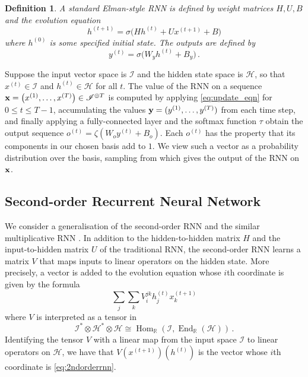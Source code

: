 \documentclass[english,letter paper,12pt,leqno]{article}
\theoremstyle{example}
\newtheorem{definition}[theorem]{Definition}
\numberwithin{equation}{section}
\def\Hom{\operatorname{Hom}}
\def\be{\begin{equation}}
\def\ee{\end{equation}}
\DeclareMathOperator{\End}{End}
\begin{document}
\begin{definition} A standard Elman-style RNN \cite{elman} is defined by weight matrices $H, U, B$ and the evolution equation
\be\label{eq:update_eqn}
h^{(t+1)} = \sigma\big( H h^{(t)} + U x^{(t+1)} + B\big)
\ee
where $h^{(0)}$ is some specified initial state. The outputs are defined by
\be\label{eq:output_rnn}
y^{(t)} = \sigma\big( W_y h^{(t)} + B_y \big)\,.
\ee
\end{definition}
Suppose the input vector space is $\mathscr{I}$ and the hidden state space is $\mathscr{H}$, so that $x^{(t)} \in \mathscr{I}$ and $h^{(t)} \in \mathscr{H}$ for all $t$. The value of the RNN on a sequence $\bold{x} = \big( x^{(1)}, \ldots, x^{(T)} \big) \in \mathscr{I}^{\oplus T}$ is computed by applying \eqref{eq:update_eqn} for $0 \le t \le T - 1$, accumulating the values $\bold{y} = (y^{(1)}, \ldots, y^{(T)})$ from each time step, and finally applying a fully-connected layer and the softmax function $\tau$ obtain the output sequence $o^{(t)} = \zeta( W_o y^{(t)} + B_o )$. Each $o^{(t)}$ has the property that its components in our chosen basis add to $1$. We view such a vector as a probability distribution over the basis, sampling from which gives the output of the RNN on $\bold{x}$.
\\

\subsection{Second-order Recurrent Neural Network}

We consider a generalisation of the second-order RNN \cite{highorderrec,pollack,firstvsecond,secondorder} and the similar multiplicative RNN \cite{sutskever}. In addition to the hidden-to-hidden matrix $H$ and the input-to-hidden matrix $U$ of the traditional RNN, the second-order RNN learns a matrix $V$ that maps inputs to linear operators on the hidden state. More precisely, a vector is added to the evolution equation whose $i$th coordinate is given by the formula
\be\label{eq:2ndorderrnn}
\sum_j \sum_k V^{jk}_{i} h^{(t)}_j x^{(t+1)}_k
\ee
where $V$ is interpreted as a tensor in
\be\label{eq:input_to_operator}
\mathscr{I}^* \otimes \mathscr{H}^* \otimes \mathscr{H} \cong \Hom_{\mathbb{R}}(\mathscr{I} , \End_{\mathbb{R}}(\mathscr{H}))\,.
\ee
Identifying the tensor $V$ with a linear map from the input space $\mathscr{I}$ to linear operators on $\mathscr{H}$, we have that $V(x^{(t+1)})(h^{(t)})$ is the vector whose $i$th coordinate is \eqref{eq:2ndorderrnn}. 
\end{document}
